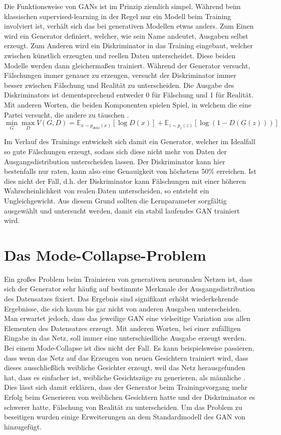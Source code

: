 Die Funktionsweise von GANs ist im Prinzip ziemlich simpel. Während beim
klassischen supervised-learning in der Regel nur ein Modell beim Training
involviert ist, verhält sich das bei generativen Modellen etwas anders. Zum
Einen wird ein Generator definiert, welcher, wie sein Name andeutet, Ausgaben
selbst erzeugt. Zum Anderen wird ein Diskriminator in das Training eingebaut,
welcher zwischen künstlich erzeugten und reellen Daten unterscheidet. Diese
beiden Modelle werden dann gleichermaßen trainiert. Während der Generator
versucht, Fälschungen immer genauer zu erzeugen, versucht der Diskriminator
immer besser zwischen Fälschung und Realität zu unterscheiden. Die
Ausgabe des Diskriminators ist dementsprechend entweder 0 für Fälschung und 1
für Realität. Mit anderen Worten, die beiden Komponenten spielen Spiel, in
welchem die eine Partei versucht, die andere zu täuschen
\cite{goodfellow2014generative}.
\[
\min_G \max_D V(G, D) = \mathbb{E}_{x \sim p_{data}(x)}\left[ \log D(x) \right] + \mathbb{E}_{z \sim p_z(z)}\left[ \log (1 - D(G(z))) \right]
\]

Im Verlauf des Trainings entwickelt sich damit ein Generator, welcher im
Idealfall so gute Fälschungen erzeugt, sodass sich diese nicht mehr von Daten
der Ausgangsdistribution unterscheiden lassen. Der Diskriminator kann hier
bestenfalls nur raten, kann also eine Genauigkeit von höchstens 50\%
erreichen. Ist dies nicht der Fall, d.h. der Diskriminator kann Fälschungen
mit einer höheren Wahrscheinlichkeit von realen Daten unterscheiden, so
entsteht ein Ungleichgewicht. Aus diesem Grund sollten die Lernparameter
sorgfältig ausgewählt und untersucht werden, damit ein stabil laufendes GAN
trainiert wird.

\section{Das Mode-Collapse-Problem}
Ein großes Problem beim Trainieren von generativen neuronalen Netzen ist, dass
sich der Generator sehr häufig auf bestimmte Merkmale der Ausgangsdistribution
des Datensatzes fixiert. Das Ergebnis sind signifikant erhöht wiederkehrende
Ergebnisse, die sich kaum bis gar nicht von anderen Ausgaben unterscheiden.
Man erwartet jedoch, dass das jeweilige GAN eine vielseitige Variation aus
allen Elementen des Datensatzes erzeugt. Mit anderen Worten, bei einer
zufälligen Eingabe in das Netz, soll immer eine unterschiedliche Ausgabe
erzeugt werden. Bei einem Mode-Collapse ist dies nicht der Fall. Es kann
beispielsweise passieren, dass wenn das Netz auf das Erzeugen von neuen
Gesichtern trainiert wird, dass dieses ausschließlich weibliche Gesichter
erzeugt, weil das Netz herausgefunden hat, dass es einfacher ist, weibliche
Gesichtszüge zu generieren, als männliche \cite{richardson2018gans}. Dies
lässt sich damit erklären, dass der Generator beim Trainingsvorgang mehr
Erfolg beim Generieren von weiblichen Gesichtern hatte und der Diskriminator
es schwerer hatte, Fälschung von Realität zu unterscheiden. Um das Problem zu
beseitigen wurden einige Erweiterungen an dem Standardmodell des GAN von
\cite{goodfellow2014generative} hinzugefügt.

